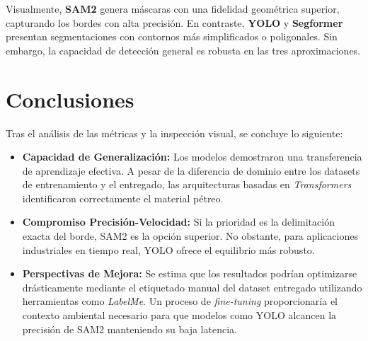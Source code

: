 Visualmente, \textbf{SAM2} genera máscaras con una fidelidad geométrica superior, capturando los bordes con alta precisión. En contraste, \textbf{YOLO} y \textbf{Segformer} presentan segmentaciones con contornos más simplificados o poligonales. Sin embargo, la capacidad de detección general es robusta en las tres aproximaciones.

\section{Conclusiones}

Tras el análisis de las métricas y la inspección visual, se concluye lo siguiente:

\begin{itemize}
	\item \textbf{Capacidad de Generalización:} Los modelos demostraron una transferencia de aprendizaje efectiva. A pesar de la diferencia de dominio entre los datasets de entrenamiento y el entregado, las arquitecturas basadas en \textit{Transformers} identificaron correctamente el material pétreo.
	\item \textbf{Compromiso Precisión-Velocidad:} Si la prioridad es la delimitación exacta del borde, SAM2 es la opción superior. No obstante, para aplicaciones industriales en tiempo real, YOLO ofrece el equilibrio más robusto.
	\item \textbf{Perspectivas de Mejora:} Se estima que los resultados podrían optimizarse drásticamente mediante el etiquetado manual del dataset entregado utilizando herramientas como \textit{LabelMe}. Un proceso de \textit{fine-tuning} proporcionaría el contexto ambiental necesario para que modelos como YOLO alcancen la precisión de SAM2 manteniendo su baja latencia.
\end{itemize}